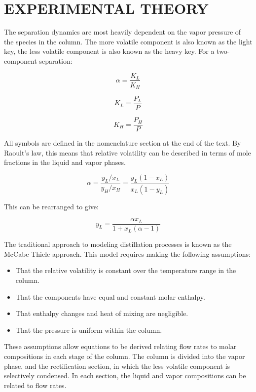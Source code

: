 \section{EXPERIMENTAL THEORY}

The separation dynamics are most heavily dependent on the vapor pressure of the species in the column. The more volatile component is also known as the light key, the less volatile component is also known as the heavy key. For a two-component separation:

\begin{equation}
    \alpha = \frac{K_L}{K_H}
\end{equation}

\begin{equation}
    K_L = \frac{P_L}{P}
\end{equation}

\begin{equation}
    K_H = \frac{P_H}{P}
\end{equation}

All symbols are defined in the nomenclature section at the end of the text. By Raoult's law, this means that relative volatility can be described in terms of mole fractions in the liquid and vapor phases.

\begin{equation}
    \alpha = \frac{y_L/x_L}{y_H/x_H} = \frac{y_L(1 - x_L)}{x_L(1 - y_L)}
\end{equation}

This can be rearranged to give:

\begin{equation}
    y_L = \frac{\alpha x_L}{1 + x_L(\alpha - 1)}
\end{equation}

The traditional approach to modeling distillation processes is known as the McCabe-Thiele approach. This model requires making the following assumptions:
\begin{itemize}
    \item That the relative volatility is constant over the temperature range in the column.
    \item That the components have equal and constant molar enthalpy.
    \item That enthalpy changes and heat of mixing are negligible.
    \item That the pressure is uniform within the column.
\end{itemize}

These assumptions allow equations to be derived relating flow rates to molar compositions in each stage of the column. The column is divided into the vapor phase, and the rectification section, in which the less volatile component is selectively condensed. In each section, the liquid and vapor compositions can be related to flow rates.

